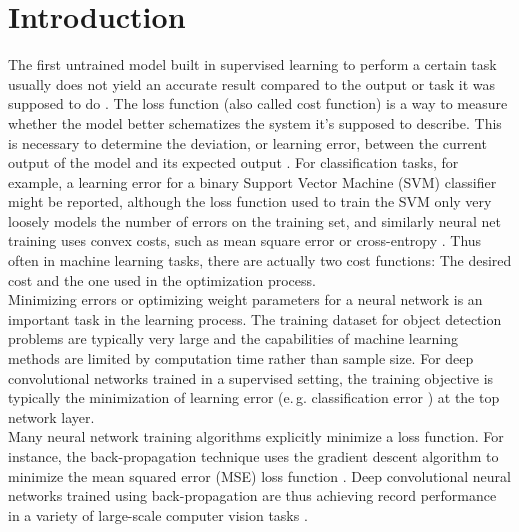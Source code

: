 \documentclass[lnbip]{svmultln}
\newcommand{\eg}{e.\,g. }
\begin{document}
%
\section{Introduction}
%
	
	
	The first untrained model built in supervised learning to perform a certain task usually does not yield an accurate result compared to the output or task it was supposed to do \cite[]{goodfellow2016deep, geron2017hands}.
	The loss function (also called cost function) is a way to measure whether the model better schematizes the system it's supposed to describe. This is necessary to determine the deviation, or learning error, %
	between the current output of the model and its expected output \cite[]{antoine2018apprentissage}. 
	For classification tasks, for example, a learning error %
	for a binary Support Vector Machine (SVM) classifier might be reported, although the loss function used to train the SVM only very loosely models the number of errors on the training set, and similarly neural net training uses convex costs, such as mean square error or cross-entropy \cite[]{burges2006learning}.  
	Thus often in machine learning tasks, there are actually two cost functions: The desired cost and the one used in the optimization process. \\
	
	Minimizing errors or optimizing weight parameters for a neural network is an important task in the learning process. The training dataset for object detection problems are typically very large and the capabilities of machine learning methods are limited by computation time rather than sample size. %
	For deep convolutional networks trained in a supervised setting, the training objective is typically the minimization of learning error (\eg classification error \cite[chap. 3]{ml2008python}) at the top network layer. \\Many neural network training algorithms explicitly minimize a loss function. For instance, the back-propagation technique uses the gradient descent algorithm to minimize the mean squared error (MSE) loss function \cite[]{bosman2020visualising}. 
	Deep convolutional neural networks trained using back-propagation are thus achieving record performance in a variety of large-scale computer vision tasks \cite[]{krizhevsky2012imagenet, simonyan2014very, huang2017densely}.\\
	
\end{document}
